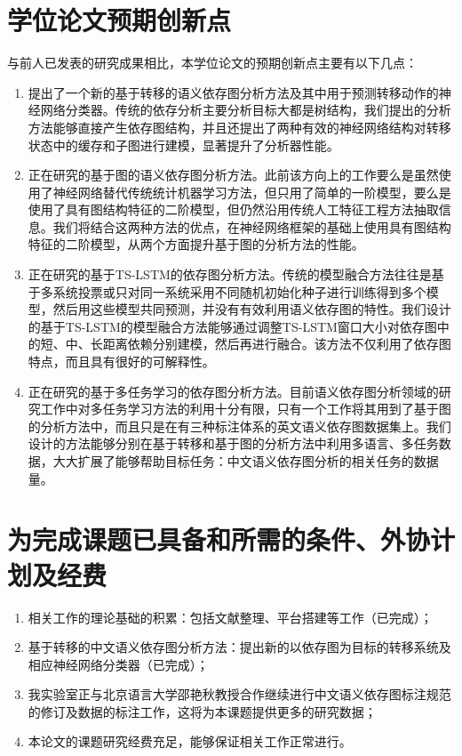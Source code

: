 \section{学位论文预期创新点}
与前人已发表的研究成果相比，本学位论文的预期创新点主要有以下几点：
\begin{enumerate}
	\item 提出了一个新的基于转移的语义依存图分析方法及其中用于预测转移动作的神经网络分类器。传统的依存分析主要分析目标大都是树结构，我们提出的分析方法能够直接产生依存图结构，并且还提出了两种有效的神经网络结构对转移状态中的缓存和子图进行建模，显著提升了分析器性能。
	\item 正在研究的基于图的语义依存图分析方法。此前该方向上的工作要么是虽然使用了神经网络替代传统统计机器学习方法，但只用了简单的一阶模型，要么是使用了具有图结构特征的二阶模型，但仍然沿用传统人工特征工程方法抽取信息。我们将结合这两种方法的优点，在神经网络框架的基础上使用具有图结构特征的二阶模型，从两个方面提升基于图的分析方法的性能。
	\item 正在研究的基于TS-LSTM的依存图分析方法。传统的模型融合方法往往是基于多系统投票或只对同一系统采用不同随机初始化种子进行训练得到多个模型，然后用这些模型共同预测，并没有有效利用语义依存图的特性。我们设计的基于TS-LSTM的模型融合方法能够通过调整TS-LSTM窗口大小对依存图中的短、中、长距离依赖分别建模，然后再进行融合。该方法不仅利用了依存图特点，而且具有很好的可解释性。
	\item 正在研究的基于多任务学习的依存图分析方法。目前语义依存图分析领域的研究工作中对多任务学习方法的利用十分有限，只有一个工作将其用到了基于图的分析方法中，而且只是在有三种标注体系的英文语义依存图数据集上。我们设计的方法能够分别在基于转移和基于图的分析方法中利用多语言、多任务数据，大大扩展了能够帮助目标任务：中文语义依存图分析的相关任务的数据量。
\end{enumerate}

\section{为完成课题已具备和所需的条件、外协计划及经费}
\begin{enumerate}
	\item 相关工作的理论基础的积累：包括文献整理、平台搭建等工作（已完成）；
	\item 基于转移的中文语义依存图分析方法：提出新的以依存图为目标的转移系统及相应神经网络分类器（已完成）；
	\item 我实验室正与北京语言大学邵艳秋教授合作继续进行中文语义依存图标注规范的修订及数据的标注工作，这将为本课题提供更多的研究数据；
	\item 本论文的课题研究经费充足，能够保证相关工作正常进行。
\end{enumerate}


